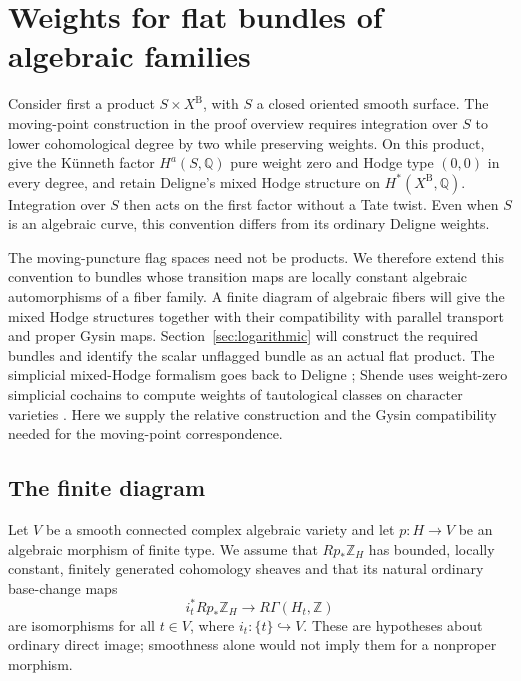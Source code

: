 \section{Weights for flat bundles of algebraic families}
\label{sec:diagram}

Consider first a product $S\times X^{\mathrm B}$, with $S$ a closed
oriented smooth surface.  The moving-point construction in the proof overview
requires integration over $S$ to lower cohomological degree by two while
preserving weights.  On this product, give the K\"unneth factor
$H^a(S,\mathbb Q)$ pure weight zero and Hodge type $(0,0)$ in every degree,
and retain Deligne's mixed Hodge structure on $H^*(X^{\mathrm B},\mathbb Q)$.
Integration over $S$ then acts on the first factor without a Tate twist.
Even when $S$ is an algebraic curve, this convention differs from its
ordinary Deligne weights.

The moving-puncture flag spaces need not be products.  We therefore
extend this convention to bundles whose transition maps are locally
constant algebraic automorphisms of a fiber family.  A finite diagram of
algebraic fibers will give the mixed Hodge structures together with their
compatibility with parallel transport and proper Gysin maps.  Section~\ref{sec:logarithmic}
will construct the required bundles and identify the scalar unflagged
bundle as an actual flat product.  The simplicial mixed-Hodge formalism
goes back to Deligne \cite[Section~8.3]{Deligne1974}; Shende uses weight-zero
simplicial cochains to compute weights of tautological classes on
character varieties \cite[proof of the main Theorem]{Shende2017}.
Here we supply the relative construction and the Gysin compatibility
needed for the moving-point correspondence.

\subsection{The finite diagram}

Let $V$ be a smooth connected complex algebraic variety and let
$p:H\to V$ be an algebraic morphism of finite type.  We assume that
$Rp_*\mathbb Z_H$ has bounded, locally constant, finitely generated
cohomology sheaves and that its natural ordinary base-change maps
\begin{equation}
 \label{diag:basechange}
 i_t^*Rp_*\mathbb Z_H\longrightarrow
 R\Gamma(H_t,\mathbb Z)
\end{equation}
are isomorphisms for all $t\in V$, where $i_t:\{t\}\hookrightarrow V$.
These are hypotheses about ordinary direct image; smoothness alone would
not imply them for a nonproper morphism.

